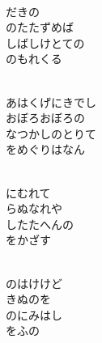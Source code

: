 \documentclass[10pt,b5j]{tarticle} %
\begin{document}
\vspace{1.5em} %
\newcommand{\linespace}{0.5em} %
\newcommand{\blocksize}{0.5\hsize} %
\newcommand{\itemmargin}{6em} %
\begin{enumerate} %
    \setlength{\itemindent}{\itemmargin} %
    \begin{minipage}[c]{\blocksize}
    
        \vspace{\linespace}
        \item~\\
        だきの\\
        のたたずめば\\
        しばしけとての\\
        のもれくる
        
        \vspace{\linespace}
        \item~\\
        あはくげにきでし\\
        おぼろおぼろの\\
        なつかしのとりて\\
        をめぐりはなん
        
        \vspace{\linespace}
        \item~\\
        にむれて\\
        らぬなれや\\
        したたへんの\\
        をかざす
        
        \vspace{\linespace}
        \item~\\
        のはけけど\\
        きぬのを\\
        のにみはし\\
        をふの
    
    \end{minipage}
\end{enumerate} %
\end{document}
